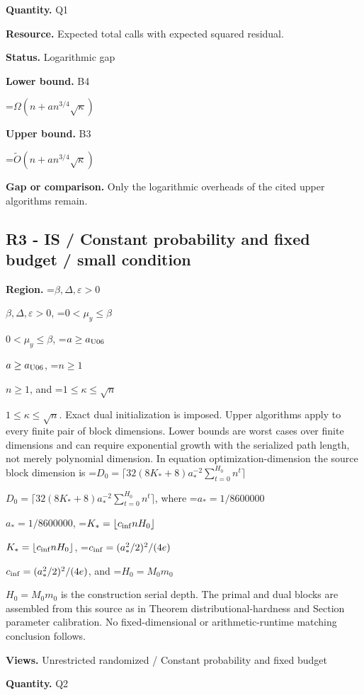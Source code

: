 \documentclass[10pt,a4paper]{article}
\newcommand{\AtlasMath}[1]{\par\begingroup\centering\setbox0=\hbox{$\displaystyle #1$}\ifdim\wd0>1.4\linewidth\typeout{ATLAS WIDE FORMULA: \the\wd0}\fi\ifdim\wd0>\linewidth\resizebox{\linewidth}{!}{\box0}\else\box0\fi\par\endgroup}
\newcommand{\AtlasInlineMath}[1]{\begingroup\setbox0=\hbox{$#1$}\ifdim\wd0>.4\linewidth\endgroup\AtlasMath{#1}\else\endgroup$#1$\fi}
\begin{document}
\textbf{Quantity.} Q1



\textbf{Resource.} Expected total calls with expected squared residual.



\textbf{Status.} Logarithmic gap



\textbf{Lower bound.} B4



\AtlasMath{\Omega(n+a n^{3/4}\sqrt\kappa)}


\textbf{Upper bound.} B3



\AtlasMath{\widetilde O(n+a n^{3/4}\sqrt\kappa)}


\textbf{Gap or comparison.} Only the logarithmic overheads of the cited upper algorithms remain.



\subsection{R3 - IS / Constant probability and fixed budget / small condition}


\textbf{Region.} \AtlasInlineMath{\beta,\Delta,\varepsilon>0}, \AtlasInlineMath{0<\mu_y\le\beta}, \AtlasInlineMath{a\ge a_{\rm U06}}, \AtlasInlineMath{n\ge1}, and \AtlasInlineMath{1\le\kappa\le\sqrt n}. Exact dual initialization is imposed. Upper algorithms apply to every finite pair of block dimensions. Lower bounds are worst cases over finite dimensions and can require exponential growth with the serialized path length, not merely polynomial dimension. In equation optimization-dimension the source block dimension is \AtlasInlineMath{D_0=\lceil32(8K_*+8)a_*^{-2}\sum_{t=0}^{H_0}n^t\rceil}, where \AtlasInlineMath{a_*=1/8600000}, \AtlasInlineMath{K_*=\lfloor c_{\rm inf}nH_0\rfloor}, \AtlasInlineMath{c_{\rm inf}=(a_*^2/2)^2/(4e)}, and \AtlasInlineMath{H_0=M_0m_0} is the construction serial depth. The primal and dual blocks are assembled from this source as in Theorem distributional-hardness and Section parameter calibration. No fixed-dimensional or arithmetic-runtime matching conclusion follows.



\textbf{Views.} Unrestricted randomized / Constant probability and fixed budget



\textbf{Quantity.} Q2
\end{document}
